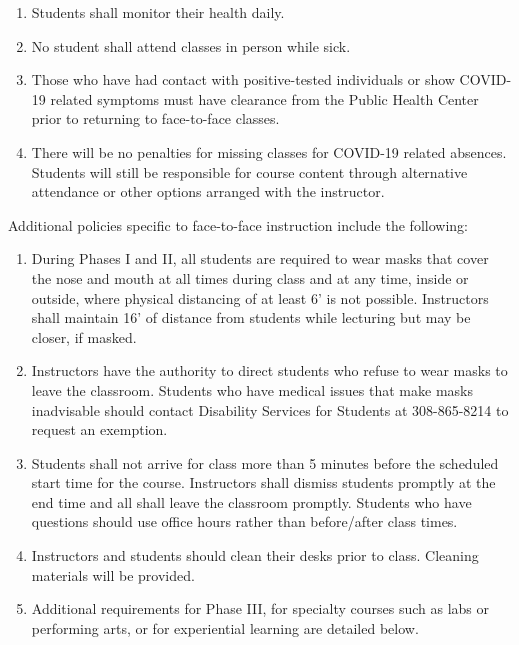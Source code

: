 \documentclass[12pt]{article}
\newcounter{ex}\setcounter{ex}{0}
\begin{document}
\begin{enumerate}

\item Students shall monitor their health daily.

\item  No student shall attend classes in person while sick.

\item  Those who have had contact with positive-tested individuals or show COVID-19 related symptoms must have clearance from the Public Health Center prior to returning to face-to-face classes.

\item There will be no penalties for missing classes for COVID-19 related absences. Students will still be responsible for course content through alternative attendance or other options arranged with the instructor.

\end{enumerate}

Additional policies specific to face-to-face instruction include the following:

\begin{enumerate}

\item       During Phases I and II, all students are required to wear masks that cover the nose and mouth at all times during class and at any time, inside or outside, where physical distancing of at least 6’ is not possible. Instructors shall maintain 16’ of distance from students while lecturing but may be closer, if masked.

\item Instructors have the authority to direct students who refuse to wear masks to leave the classroom. Students who have medical issues that make masks inadvisable should contact Disability Services for Students at 308-865-8214 to request an exemption.

\item       Students shall not arrive for class more than 5 minutes before the scheduled start time for the course. Instructors shall dismiss students promptly at the end time and all shall leave the classroom promptly. Students who have questions should use office hours rather than before/after class times.

\item       Instructors and students should clean their desks prior to class. Cleaning materials will be provided.

\item       Additional requirements for Phase III, for specialty courses such as labs or performing arts, or for experiential learning are detailed below.

\end{enumerate}
\end{document}
